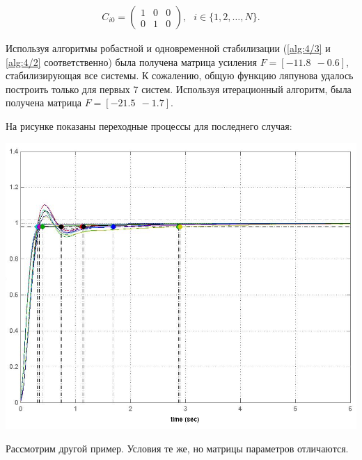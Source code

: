 \begin{equation*}
\begin{array}{lr}
C_{i0} = \left(\begin{array}{ccc}
1 & 0 & 0 \\
0 & 1 & 0
\end{array}\right)\mbox{,} &
i \in \{1,2,\ldots,N\}\mbox{.}


\end{array}
\end{equation*}

Используя алгоритмы робастной и одновременной стабилизации (\vref{alg:4/3} и \vref{alg:4/2} соответственно) была получена матрица усиления $F = [-11.8~~-0.6]$, стабилизирующая все системы. К сожалению, общую функцию ляпунова удалось построить только для первых 7 систем. Используя итерационный алгоритм, была получена матрица $F = [-21.5~~-1.7]$.

На рисунке показаны переходные процессы для последнего случая:

\includegraphics[scale=0.4]{screenshot.png}

Рассмотрим другой пример. Условия те же, но матрицы параметров отличаются.

